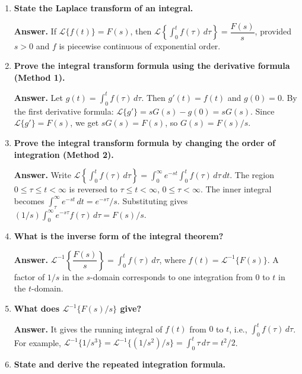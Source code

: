 \documentclass[12pt,a4paper]{article}
\begin{document}
\begin{enumerate}[label=\textbf{Q\arabic*.}, leftmargin=*, itemsep=8pt]

\item \textbf{State the Laplace transform of an integral.}

  \textbf{Answer.} If $\mathcal{L}\{f(t)\} = F(s)$, then
  $\mathcal{L}\!\left\{\int_0^t f(\tau)\,d\tau\right\} = \dfrac{F(s)}{s}$,
  provided $s > 0$ and $f$ is piecewise continuous of exponential order.

\item \textbf{Prove the integral transform formula using the derivative formula (Method 1).}

  \textbf{Answer.} Let $g(t) = \int_0^t f(\tau)\,d\tau$. Then $g'(t) = f(t)$ and
  $g(0) = 0$. By the first derivative formula: $\mathcal{L}\{g'\} = sG(s) - g(0) = sG(s)$.
  Since $\mathcal{L}\{g'\} = F(s)$, we get $sG(s) = F(s)$, so $G(s) = F(s)/s$.

\item \textbf{Prove the integral transform formula by changing the order of integration (Method 2).}

  \textbf{Answer.} Write
  $\mathcal{L}\!\left\{\int_0^t f(\tau)\,d\tau\right\}
  = \int_0^\infty e^{-st}\!\int_0^t f(\tau)\,d\tau\,dt$.
  The region $0 \leq \tau \leq t < \infty$ is reversed to $\tau \leq t < \infty$,
  $0 \leq \tau < \infty$. The inner integral becomes
  $\int_\tau^\infty e^{-st}\,dt = e^{-s\tau}/s$. Substituting gives
  $(1/s)\int_0^\infty e^{-s\tau} f(\tau)\,d\tau = F(s)/s$.

\item \textbf{What is the inverse form of the integral theorem?}

  \textbf{Answer.}
  $\mathcal{L}^{-1}\!\left\{\dfrac{F(s)}{s}\right\} = \int_0^t f(\tau)\,d\tau$,
  where $f(t) = \mathcal{L}^{-1}\{F(s)\}$. A factor of $1/s$ in the $s$-domain
  corresponds to one integration from $0$ to $t$ in the $t$-domain.

\item \textbf{What does $\mathcal{L}^{-1}\{F(s)/s\}$ give?}

  \textbf{Answer.} It gives the running integral of $f(t)$ from $0$ to $t$,
  i.e., $\int_0^t f(\tau)\,d\tau$. For example,
  $\mathcal{L}^{-1}\{1/s^3\} = \mathcal{L}^{-1}\{(1/s^2)/s\} = \int_0^t \tau\,d\tau = t^2/2$.

\item \textbf{State and derive the repeated integration formula.}


\end{enumerate}
\end{document}
